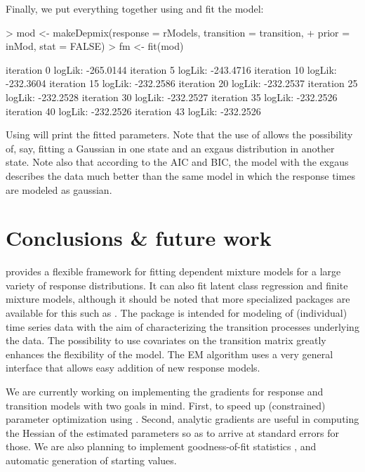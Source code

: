 \documentclass[article]{jss}
\begin{document}
Finally, we put everything together using  and fit 
the model: 
\begin{Schunk}
\begin{Sinput}
> mod <- makeDepmix(response = rModels, transition = transition, 
+     prior = inMod, stat = FALSE)
> fm <- fit(mod)
\end{Sinput}
\begin{Soutput}
iteration 0 logLik: -265.0144 
iteration 5 logLik: -243.4716 
iteration 10 logLik: -232.3604 
iteration 15 logLik: -232.2586 
iteration 20 logLik: -232.2537 
iteration 25 logLik: -232.2528 
iteration 30 logLik: -232.2527 
iteration 35 logLik: -232.2526 
iteration 40 logLik: -232.2526 
iteration 43 logLik: -232.2526 
\end{Soutput}
\end{Schunk}

Using  will print the fitted parameters.  Note that the
use of  allows the possibility of, say, fitting a
Gaussian in one state and an exgaus distribution in another state.
Note also that according to the AIC and BIC, the model with the exgaus
describes the data much better than the same model in which the
response times are modeled as gaussian.


\section[Conclusions and future work]{Conclusions \& future work}

 provides a flexible framework for fitting dependent
mixture models for a large variety of response distributions.  It can
also fit latent class regression and finite mixture models, although
it should be noted that more specialized packages are available for
this such as  \citep{Leisch2004}.  The package is
intended for modeling of (individual) time series data with the aim of
characterizing the transition processes underlying the data.  The
possibility to use covariates on the transition matrix greatly
enhances the flexibility of the model.  The EM algorithm uses a very
general interface that allows easy addition of new response models.

We are currently working on implementing the gradients for response
and transition models with two goals in mind.  First, to speed up
(constrained) parameter optimization using .  Second,
analytic gradients are useful in computing the Hessian of the
estimated parameters so as to arrive at standard errors for those.  We
are also planning to implement goodness-of-fit statistics
\citep{Titman2008}, and automatic generation of starting values.
\end{document}
